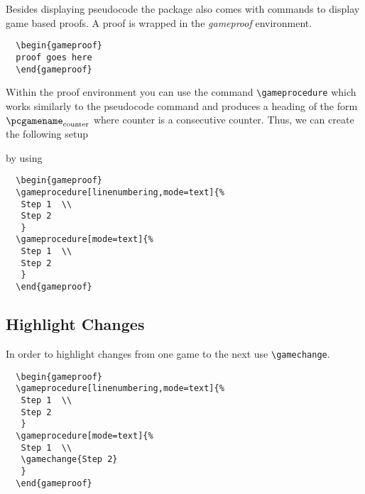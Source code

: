 \documentclass[a4paper]{report}
\begin{document}
  Besides displaying pseudocode the package also comes with commands to display game based proofs. A proof
  is wrapped in the \emph{gameproof} environment. 
  \begin{lstlisting}
  \begin{gameproof}
  proof goes here
  \end{gameproof}
  \end{lstlisting}
  Within the proof environment you can use the command \lstinline$\gameprocedure$ which works similarly to the pseudocode
  command and produces a heading of the form $\pcgamename_{\text{counter}}$ where counter is a consecutive counter.
  Thus, we can create the following setup
  \begin{center}
  \begin{gameproof}
  \end{gameproof}
  \end{center}
  by using
  \begin{lstlisting}
  \begin{gameproof}
  \gameprocedure[linenumbering,mode=text]{%
   Step 1  \\
   Step 2  
   }
  \gameprocedure[mode=text]{%
   Step 1  \\
   Step 2  
   }
  \end{gameproof}
  \end{lstlisting}
  
  
  
  \subsection{Highlight Changes}
  In order to highlight changes from one game to the next use \lstinline$\gamechange$.
  \begin{center}
  \begin{gameproof}
  \end{gameproof}
  \end{center}
  \begin{lstlisting}
  \begin{gameproof}
  \gameprocedure[linenumbering,mode=text]{%
   Step 1  \\
   Step 2  
   }
  \gameprocedure[mode=text]{%
   Step 1  \\
   \gamechange{Step 2}
   }
  \end{gameproof}
  \end{lstlisting}
  
\end{document}

